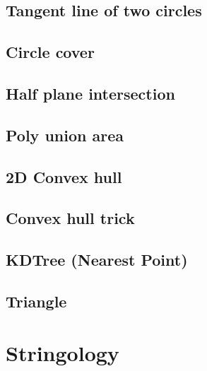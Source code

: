 \documentclass[a4paper,10pt,twocolumn,oneside]{article}
\begin{document}
\subsection{Tangent line of two circles}


\subsection{Circle cover}


\subsection{Half plane intersection}


\subsection{Poly union area}


\subsection{2D Convex hull}


\subsection{Convex hull trick}


\subsection{KDTree (Nearest Point)}


\subsection{Triangle}


\section{Stringology}

%
\end{document}
